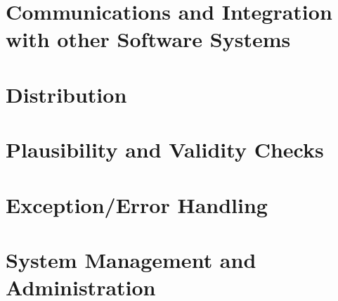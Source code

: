 
\section{Communications and Integration with other Software Systems}
\label{sec:Communications and Integration with other Software Systems}


\section{Distribution}
\label{sec:Distribution}


\section{Plausibility and Validity Checks}
\label{sec:Plausibility and Validity Checks}


\section{Exception/Error Handling}
\label{sec:Exception/Error Handling}


\section{System Management and Administration}
\label{sec:System Management and Administration}

